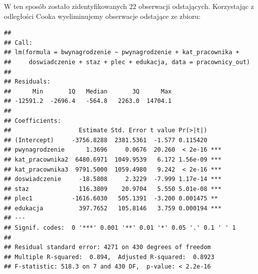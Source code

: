 \documentclass[
]{book}
\newenvironment{Shaded}{\begin{snugshade}}{\end{snugshade}}
\newcommand{\DataTypeTok}[1]{\textcolor[rgb]{0.13,0.29,0.53}{#1}}
\newcommand{\KeywordTok}[1]{\textcolor[rgb]{0.13,0.29,0.53}{\textbf{#1}}}
\newcommand{\NormalTok}[1]{#1}
\newcommand{\OperatorTok}[1]{\textcolor[rgb]{0.81,0.36,0.00}{\textbf{#1}}}
\newcommand{\StringTok}[1]{\textcolor[rgb]{0.31,0.60,0.02}{#1}}
\begin{document}
W ten sposób zostało zidentyfikowanych 22 obserwacji odstających. Korzystając z odległości Cooka wyeliminujemy obserwacje odstające ze zbioru:

\begin{Shaded}
\end{Shaded}

\begin{verbatim}
## 
## Call:
## lm(formula = bwynagrodzenie ~ pwynagrodzenie + kat_pracownika + 
##     doswiadczenie + staz + plec + edukacja, data = pracownicy_out)
## 
## Residuals:
##      Min       1Q   Median       3Q      Max 
## -12591.2  -2696.4   -564.8   2263.0  14704.1 
## 
## Coefficients:
##                   Estimate Std. Error t value Pr(>|t|)    
## (Intercept)     -3756.8288  2381.5361  -1.577 0.115420    
## pwynagrodzenie      1.3696     0.0676  20.260  < 2e-16 ***
## kat_pracownika2  6480.6971  1049.9539   6.172 1.56e-09 ***
## kat_pracownika3  9791.5000  1059.4980   9.242  < 2e-16 ***
## doswiadczenie     -18.5808     2.3229  -7.999 1.17e-14 ***
## staz              116.3809    20.9704   5.550 5.01e-08 ***
## plec1           -1616.6030   505.1391  -3.200 0.001475 ** 
## edukacja          397.7652   105.8146   3.759 0.000194 ***
## ---
## Signif. codes:  0 '***' 0.001 '**' 0.01 '*' 0.05 '.' 0.1 ' ' 1
## 
## Residual standard error: 4271 on 430 degrees of freedom
## Multiple R-squared:  0.894,  Adjusted R-squared:  0.8923 
## F-statistic: 518.3 on 7 and 430 DF,  p-value: < 2.2e-16
\end{verbatim}
\end{document}
